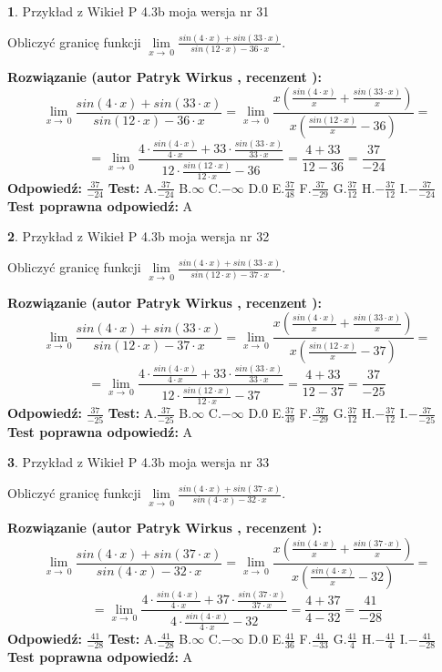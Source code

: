 \documentclass[12pt, a4paper]{article}
\theoremstyle{definition} %
\newtheorem{zad}{}
\newcommand{\zadStart}[1]{\begin{zad}#1\newline}
\newcommand{\zadStop}{\end{zad}}
\newcommand{\rozwStart}[2]{\noindent \textbf{Rozwiązanie (autor #1 , recenzent #2): }\newline}
\newcommand{\rozwStop}{\newline}
\newcommand{\odpStart}{\noindent \textbf{Odpowiedź:}\newline}
\newcommand{\odpStop}{\newline}
\newcommand{\testStart}{\noindent \textbf{Test:}\newline}
\newcommand{\testStop}{\newline}
\newcommand{\kluczStart}{\noindent \textbf{Test poprawna odpowiedź:}\newline}
\newcommand{\kluczStop}{\newline}
\begin{document}
\zadStart{Przykład z Wikieł P 4.3b moja wersja nr 31}


Obliczyć granicę funkcji $\lim\limits_{x\to\ 0}\frac{sin(4 \cdot x)+sin(33 \cdot x)}{sin(12 \cdot x)-36 \cdot x}$.
\zadStop
\rozwStart{Patryk Wirkus}{}
$$\lim\limits_{x\to\ 0}\frac{sin(4 \cdot x)+sin(33 \cdot x)}{sin(12 \cdot x)-36 \cdot x}=\lim\limits_{x\to\ 0}\frac{x(\frac{sin(4 \cdot x)}{x}+\frac{sin(33 \cdot x)}{x})}{x(\frac{sin(12 \cdot x)}{x}-36)}=$$
$$=\lim\limits_{x\to\ 0}\frac{4 \cdot \frac{sin(4 \cdot x)}{4 \cdot x}+33 \cdot \frac{sin(33 \cdot x)}{33 \cdot x}}{12 \cdot \frac{sin(12 \cdot x)}{12 \cdot x}-36}=\frac{4+33}{12-36} = \frac{37}{-24}$$
\rozwStop
\odpStart
$\frac{37}{-24}$
\odpStop
\testStart
A.$\frac{37}{-24}$
B.$\infty$
C.$-\infty$
D.$0$
E.$\frac{37}{48}$
F.$\frac{37}{-29}$
G.$\frac{37}{12}$
H.$-\frac{37}{12}$
I.$-\frac{37}{-24}$
\testStop
\kluczStart
A
\kluczStop



\zadStart{Przykład z Wikieł P 4.3b moja wersja nr 32}


Obliczyć granicę funkcji $\lim\limits_{x\to\ 0}\frac{sin(4 \cdot x)+sin(33 \cdot x)}{sin(12 \cdot x)-37 \cdot x}$.
\zadStop
\rozwStart{Patryk Wirkus}{}
$$\lim\limits_{x\to\ 0}\frac{sin(4 \cdot x)+sin(33 \cdot x)}{sin(12 \cdot x)-37 \cdot x}=\lim\limits_{x\to\ 0}\frac{x(\frac{sin(4 \cdot x)}{x}+\frac{sin(33 \cdot x)}{x})}{x(\frac{sin(12 \cdot x)}{x}-37)}=$$
$$=\lim\limits_{x\to\ 0}\frac{4 \cdot \frac{sin(4 \cdot x)}{4 \cdot x}+33 \cdot \frac{sin(33 \cdot x)}{33 \cdot x}}{12 \cdot \frac{sin(12 \cdot x)}{12 \cdot x}-37}=\frac{4+33}{12-37} = \frac{37}{-25}$$
\rozwStop
\odpStart
$\frac{37}{-25}$
\odpStop
\testStart
A.$\frac{37}{-25}$
B.$\infty$
C.$-\infty$
D.$0$
E.$\frac{37}{49}$
F.$\frac{37}{-29}$
G.$\frac{37}{12}$
H.$-\frac{37}{12}$
I.$-\frac{37}{-25}$
\testStop
\kluczStart
A
\kluczStop



\zadStart{Przykład z Wikieł P 4.3b moja wersja nr 33}


Obliczyć granicę funkcji $\lim\limits_{x\to\ 0}\frac{sin(4 \cdot x)+sin(37 \cdot x)}{sin(4 \cdot x)-32 \cdot x}$.
\zadStop
\rozwStart{Patryk Wirkus}{}
$$\lim\limits_{x\to\ 0}\frac{sin(4 \cdot x)+sin(37 \cdot x)}{sin(4 \cdot x)-32 \cdot x}=\lim\limits_{x\to\ 0}\frac{x(\frac{sin(4 \cdot x)}{x}+\frac{sin(37 \cdot x)}{x})}{x(\frac{sin(4 \cdot x)}{x}-32)}=$$
$$=\lim\limits_{x\to\ 0}\frac{4 \cdot \frac{sin(4 \cdot x)}{4 \cdot x}+37 \cdot \frac{sin(37 \cdot x)}{37 \cdot x}}{4 \cdot \frac{sin(4 \cdot x)}{4 \cdot x}-32}=\frac{4+37}{4-32} = \frac{41}{-28}$$
\rozwStop
\odpStart
$\frac{41}{-28}$
\odpStop
\testStart
A.$\frac{41}{-28}$
B.$\infty$
C.$-\infty$
D.$0$
E.$\frac{41}{36}$
F.$\frac{41}{-33}$
G.$\frac{41}{4}$
H.$-\frac{41}{4}$
I.$-\frac{41}{-28}$
\testStop
\kluczStart
A
\kluczStop
\end{document}
